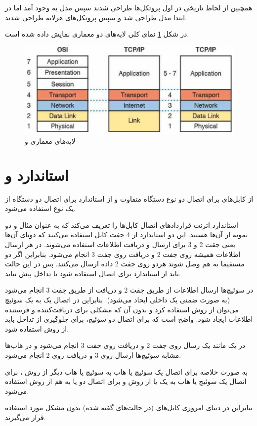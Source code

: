 \documentclass{article}
\begin{document}
همچنین از لحاظ تاریخی در  اول پروتکل‌ها طراحی شدند سپس مدل به وجود آمد اما در  ابتدا مدل طراحی شد و سپس پروتکل‌های هرلایه طراحی شدند.

\newpage

در شکل \ref{fig:layers} نمای کلی لایه‌های دو معماری نمایش داده شده است. 
\begin{figure}[h]
	\centering
	\includegraphics[width=0.6\columnwidth]{figs/osi-tcpip.jpg}
	\caption{لایه‌های معماری  و }
	\label{fig:layers}
\end{figure}

\section{استاندارد  و }
از کابل‌های  برای اتصال دو نوع دستگاه متفاوت و از استاندارد  برای اتصال دو دستگاه از یک نوع استفاده می‌شود.

استاندارد اترنت  قراردادهای اتصال کابل‌ها را تعریف می‌کند که به عنوان مثال  و  دو نمونه از آن‌ها هستند. این دو استاندارد از 4 جفت کابل  استفاده می‌کنند که دوتای آن‌ها یعنی جقت 2 و 3 برای ارسال و دریافت اطلاعات استفاده می‌شوند.
 در هر  ارسال اطلاعات همیشه روی جفت 2 و دریافت روی جفت 3 انجام می‌شود. بنابراین اگر دو  مستقیما به هم وصل شوند هردو روی جفت 2 داده ارسال می‌کنند. پس در این حالت باید از استاندارد  برای اتصال استفاده شود تا تداخل پیش نیاید.
 
 در سوئیچ‌ها ارسال اطلاعات از طریق جفت 2 و دریافت از طریق جفت 3 انجام می‌شود (به صورت ضمنی یک  داخلی ایحاد می‌شود). بنابراین در اتصال یک  به یک سوئیچ می‌توان از روش  استفاده کرد و بدون آن که مشکلی برای دریافت‌کننده و فرستنده اطلاعات ایجاد شود.
 واضح است که برای اتصال دو سوئیچ، برای جلوگیری از تداخل باید از روش  استفاده شود.
 
 در یک  مانند یک  رسال روی جفت 2 و دریافت روی جفت 3 انجام می‌شود و در هاب‌ها مشابه سوئیچ‌ها ارسال روی 3 و دریافت روی 2 انجام می‌شود.
 
 به صورت خلاصه برای اتصال یک سوئیچ یا هاب به سوئیچ یا هاب دیگر از روش ، برای اتصال یک سوئیچ یا هاب به یک  یا  از روش  و برای اتصال دو  یا  به هم از روش  استفاده می‌شود.
 
 بنابراین در دنیای امروزی کابل‌های  (در حالت‌های گفته شده) بدون مشکل مورد استفاده قرار می‌گیرند.
\end{document}
